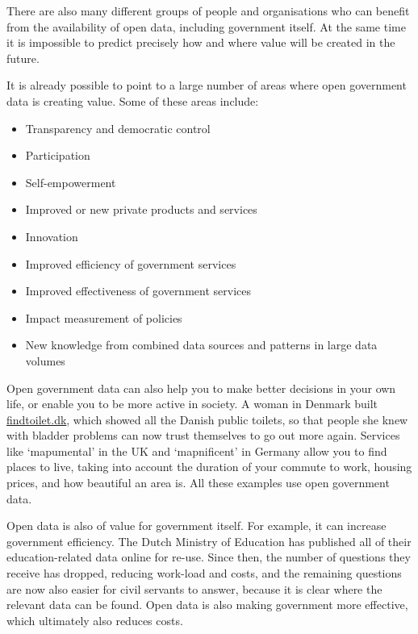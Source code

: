 \documentclass[letterpaper,10pt,oneside]{sphinxmanual}
\begin{document}
There are also many different groups of people and organisations who can benefit from the availability of open data, including government itself. At the same time it is impossible to predict precisely how and where value will be created in the future.

It is already possible to point to a large number of areas where open government data is creating value. Some of these areas include:
\begin{itemize}
\item {} 
Transparency and democratic control

\item {} 
Participation

\item {} 
Self-empowerment

\item {} 
Improved or new private products and services

\item {} 
Innovation

\item {} 
Improved efficiency of government services

\item {} 
Improved effectiveness of government services

\item {} 
Impact measurement of policies

\item {} 
New knowledge from combined data sources and patterns in large data volumes

\end{itemize}

Open government data can also help you to make better decisions in your own life, or enable you to be more active in society. A woman in Denmark built \href{http://findtoilet.dk}{findtoilet.dk}, which showed all the Danish public toilets, so that people she knew with bladder problems can now trust themselves to go out more again.
Services like ‘mapumental’ in the UK and ‘mapnificent’ in Germany allow you to find places to live, taking into account the duration of your commute to work, housing prices, and how beautiful an area is. All these examples use open government data.

Open data is also of value for government itself. For example, it can increase government efficiency. The Dutch Ministry of Education has published all of their education-related data online for re-use. Since then, the number of questions they receive has dropped, reducing work-load and costs, and the remaining questions are now also easier for civil servants to answer, because it is clear where the relevant data can be found. Open data is also making government more effective, which ultimately also reduces costs.
\end{document}
